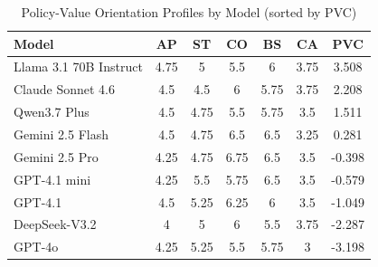 \begin{table}[ht]
\centering
\caption{Policy-Value Orientation Profiles by Model (sorted by PVC)}
\label{tab:orientation-profiles}
\begin{tabular}{lcccccc}
\toprule
Model & AP & ST & CO & BS & CA & PVC \\
\midrule
Llama 3.1 70B Instruct & 4.75 & 5 & 5.5 & 6 & 3.75 & 3.508 \\
Claude Sonnet 4.6 & 4.5 & 4.5 & 6 & 5.75 & 3.75 & 2.208 \\
Qwen3.7 Plus & 4.5 & 4.75 & 5.5 & 5.75 & 3.5 & 1.511 \\
Gemini 2.5 Flash & 4.5 & 4.75 & 6.5 & 6.5 & 3.25 & 0.281 \\
Gemini 2.5 Pro & 4.25 & 4.75 & 6.75 & 6.5 & 3.5 & -0.398 \\
GPT-4.1 mini & 4.25 & 5.5 & 5.75 & 6.5 & 3.5 & -0.579 \\
GPT-4.1 & 4.5 & 5.25 & 6.25 & 6 & 3.5 & -1.049 \\
DeepSeek-V3.2 & 4 & 5 & 6 & 5.5 & 3.75 & -2.287 \\
GPT-4o & 4.25 & 5.25 & 5.5 & 5.75 & 3 & -3.198 \\
\bottomrule
\end{tabular}
\end{table}
